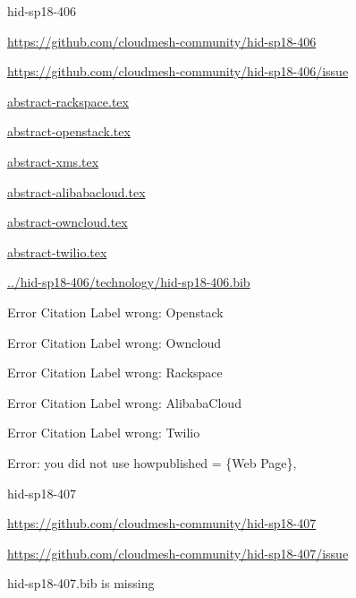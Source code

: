 \begin{IU}

hid-sp18-406

\url{https://github.com/cloudmesh-community/hid-sp18-406}

\url{https://github.com/cloudmesh-community/hid-sp18-406/issue}

\href{https://github.com/cloudmesh-community/hid-sp18-406/blob/master//technology/abstract-rackspace.tex}{abstract-rackspace.tex}

\href{https://github.com/cloudmesh-community/hid-sp18-406/blob/master//technology/abstract-openstack.tex}{abstract-openstack.tex}

\href{https://github.com/cloudmesh-community/hid-sp18-406/blob/master//technology/abstract-xms.tex}{abstract-xms.tex}

\href{https://github.com/cloudmesh-community/hid-sp18-406/blob/master//technology/abstract-alibabacloud.tex}{abstract-alibabacloud.tex}

\href{https://github.com/cloudmesh-community/hid-sp18-406/blob/master//technology/abstract-owncloud.tex}{abstract-owncloud.tex}

\href{https://github.com/cloudmesh-community/hid-sp18-406/blob/master//technology/abstract-twilio.tex}{abstract-twilio.tex}

\href{https://github.com/cloudmesh-community/hid-sp18-406/blob/master//technology/hid-sp18-406.bib}{../hid-sp18-406/technology/hid-sp18-406.bib}

 Error Citation Label wrong: Openstack

 Error Citation Label wrong: Owncloud

 Error Citation Label wrong: Rackspace

 Error Citation Label wrong: AlibabaCloud

 Error Citation Label wrong: Twilio

Error: you did not use howpublished = \{Web Page\},

\end{IU}


\begin{IU}

hid-sp18-407

\url{https://github.com/cloudmesh-community/hid-sp18-407}

\url{https://github.com/cloudmesh-community/hid-sp18-407/issue}

hid-sp18-407.bib is missing

\end{IU}


